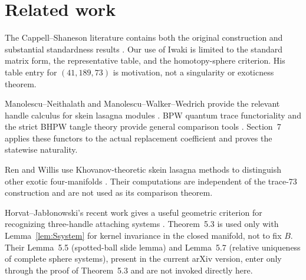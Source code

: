\section{Related work}

The Cappell--Shaneson literature contains both the original construction
\cite{CappellShaneson1976,AitchisonRubinstein1984} and substantial
standardness results
\cite{Akbulut2010,Gompf2010,KimYamada2017,Iwaki2024}.  Our use of Iwaki is
limited to the standard matrix form, the representative table, and the
homotopy-sphere criterion.  His table entry for $(41,189,73)$ is motivation,
not a singularity or exoticness theorem.

Manolescu--Neithalath and Manolescu--Walker--Wedrich provide the relevant
handle calculus for skein lasagna modules
\cite{ManolescuNeithalath2020,ManolescuWalkerWedrich2023}.  BPW quantum trace
functoriality and the strict BHPW tangle theory provide general comparison
tools \cite{BeliakovaPutyraWehrli2019,
BeliakovaHogancampPutyraWehrli2023}.  Section~7 applies these functors to the
actual replacement coefficient and proves the statewise naturality.

Ren and Willis use Khovanov-theoretic skein lasagna methods to distinguish
other exotic four-manifolds \cite{RenWillis2024}.  Their computations are
independent of the trace-73 construction and are not used as its comparison
theorem.

Horvat--Jab\l{}onowski's recent work gives a useful geometric criterion for
recognizing three-handle attaching systems \cite{HorvatJablonowski2025}.
Theorem~5.3 is used only with Lemma~\ref{lem:Ssystem} for kernel invariance
in the closed manifold, not to fix $B$.  Their Lemma~5.5 (spotted-ball slide
lemma) and Lemma~5.7 (relative uniqueness of complete sphere systems),
present in the current arXiv version, enter only through the proof of
Theorem~5.3 and are not invoked directly here.
